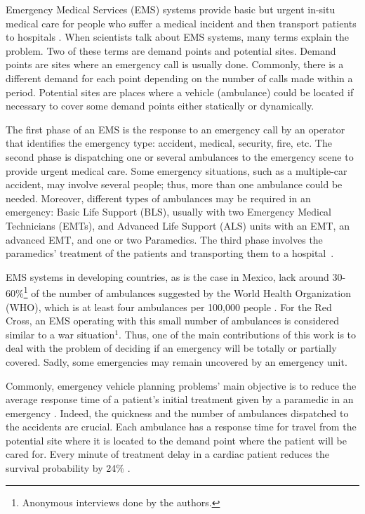 Emergency Medical Services (EMS) systems provide basic but urgent in-situ medical care for people who suffer a medical incident and then transport patients to hospitals \citep{aringhieri2017emergency, belanger2019recent, reuter2017logistics}. When scientists talk about EMS systems, many terms explain the problem. Two of these terms are demand points and potential sites. Demand points are sites where an emergency call is usually done. Commonly, there is a different demand for each point depending on the number of calls made within a period. Potential sites are places where a vehicle (ambulance) could be located if necessary to cover some demand points either statically or dynamically.

The first phase of an EMS is the response to an emergency call by an operator that identifies the emergency type: accident, medical, security, fire, etc. The second phase is dispatching one or several ambulances to the emergency scene to provide urgent medical care. Some emergency situations, such as a multiple-car accident, may involve several people; thus, more than one ambulance could be needed. Moreover, different types of ambulances may be required in an emergency: Basic Life Support (BLS), usually with two Emergency Medical Technicians (EMTs), and Advanced Life Support (ALS) units with an EMT, an advanced EMT, and one or two Paramedics. The third phase involves the paramedics' treatment of the patients and transporting them to a hospital~\citep{aringhieri2017emergency}. 

EMS systems in developing countries, as is the case in Mexico, lack around 30-60\%\footnote{Anonymous interviews done by the authors.} of the number of ambulances suggested by the World Health Organization (WHO), which is at least four ambulances per 100,000 people \citep{braun1990characteristics}. For the Red Cross, an EMS operating with this small number of ambulances is considered similar to a war situation$^1$. Thus, one of the main contributions of this work is to deal with the problem of deciding if an emergency will be totally or partially covered. Sadly, some emergencies may remain uncovered by an emergency unit. 

Commonly, emergency vehicle planning problems' main objective is to reduce the average response time of a patient's initial treatment given by a paramedic in an emergency \citep{amorim2019traffic, bandara2012optimal,toro2013joint, toro2015reducing}. Indeed, the quickness and the number of ambulances dispatched to the accidents are crucial. Each ambulance has a response time for travel from the potential site where it is located to the demand point where the patient will be cared for. Every minute of treatment delay in a cardiac patient reduces the survival probability by 24\% \citep{o2010role}.  


